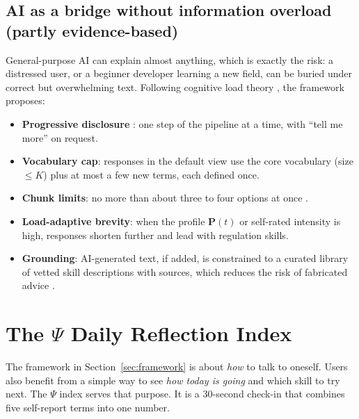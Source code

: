 \documentclass[11pt]{article}
\begin{document}
\subsection{AI as a bridge without information overload (partly evidence-based)}
General-purpose AI can explain almost anything, which is exactly the risk: a distressed user, or a beginner developer learning a new field, can be buried under correct but overwhelming text. Following cognitive load theory \citep{sweller1988}, the framework proposes:
\begin{itemize}
\item \textbf{Progressive disclosure} \citep{nielsen2006}: one step of the pipeline at a time, with ``tell me more'' on request.
\item \textbf{Vocabulary cap}: responses in the default view use the core vocabulary (size $\le K$) plus at most a few new terms, each defined once.
\item \textbf{Chunk limits}: no more than about three to four options at once \citep{cowan2001}.
\item \textbf{Load-adaptive brevity}: when the profile $\mathbf{P}(t)$ or self-rated intensity is high, responses shorten further and lead with regulation skills.
\item \textbf{Grounding}: AI-generated text, if added, is constrained to a curated library of vetted skill descriptions with sources, which reduces the risk of fabricated advice \citep{bommasani2021}.
\end{itemize}


\section{The $\Psi$ Daily Reflection Index}\label{sec:psi}
The framework in Section~\ref{sec:framework} is about \emph{how} to talk to oneself. Users also benefit from a simple way to see \emph{how today is going} and which skill to try next. The $\Psi$ index serves that purpose. It is a 30-second check-in that combines five self-report terms into one number.

\begin{center}
\end{center}
\end{document}
